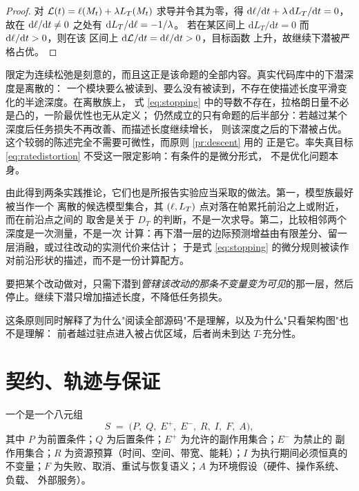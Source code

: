 \begin{proof}
对 $\mathcal{L}(t) = \ell(M_t) + \lambda L_T(M_t)$ 求导并令其为零，得
$\mathrm{d}\ell/\mathrm{d}t + \lambda\,\mathrm{d}L_T/\mathrm{d}t = 0$，故在
$\mathrm{d}\ell/\mathrm{d}t \ne 0$ 之处有 $\mathrm{d}L_T/\mathrm{d}\ell = -1/\lambda$。
若在某区间上 $\mathrm{d}L_T/\mathrm{d}t = 0$ 而 $\mathrm{d}\ell/\mathrm{d}t > 0$，则在该
区间上 $\mathrm{d}\mathcal{L}/\mathrm{d}t = \mathrm{d}\ell/\mathrm{d}t > 0$，目标函数
上升，故继续下潜被严格占优。
\end{proof}

限定为连续松弛是刻意的，而且这正是该命题的全部内容。真实代码库中的下潜深度是离散的：
一个模块要么被读到、要么没有被读到，不存在使描述长度平滑变化的半途深度。在离散族上，
式 \eqref{eq:stopping} 中的导数不存在，拉格朗日量不必是凸的，一阶最优性也无从定义；
仍然成立的只有命题的后半部分：若越过某个深度后任务损失不再改善、而描述长度继续增长，
则该深度之后的下潜被占优。这个较弱的陈述完全不需要可微性，而原则 \ref{pr:descent} 用的
正是它。率失真目标 \eqref{eq:ratedistortion} 不受这一限定影响：有条件的是微分形式，
不是优化问题本身。

由此得到两条实践推论，它们也是所报告实验应当采取的做法。第一，模型族最好被当作一个
离散的候选模型集合，其 $(\ell, L_T)$ 点对落在帕累托前沿之上或附近，而在前沿点之间的
取舍是关于 $D_T$ 的判断，不是一次求导。第二，比较相邻两个深度是一次测量，不是一次
计算：再下潜一层的边际预测增益由有限差分、留一层消融，或过往改动的实测代价来估计；
于是式 \eqref{eq:stopping} 的微分规则被读作对前沿形状的描述，而不是一份计算配方。

\begin{principle}\label{pr:descent}
要把某个改动做对，只需下潜到\emph{管辖该改动的那条不变量变为可见}的那一层，然后
停止。继续下潜只增加描述长度，不降低任务损失。
\end{principle}

这条原则同时解释了为什么"阅读全部源码"不是理解，以及为什么"只看架构图"也不是理解：
前者越过驻点进入被占优区域，后者尚未到达 $T$-充分性。

\section{契约、轨迹与保证}\label{sec:contract}

\begin{definition}[行为契约]\label{def:contract}
一个是一个八元组
\begin{equation}\label{eq:contract}
S \;=\; \bigl(P,\; Q,\; E^{+},\; E^{-},\; R,\; I,\; F,\; A\bigr),
\end{equation}
其中 $P$ 为前置条件；$Q$ 为后置条件；$E^{+}$ 为允许的副作用集合；$E^{-}$ 为禁止的
副作用集合；$R$ 为资源预算（时间、空间、带宽、能耗）；$I$ 为执行期间必须恒真的
不变量；$F$ 为失败、取消、重试与恢复语义；$A$ 为环境假设（硬件、操作系统、负载、
外部服务）。
\end{definition}

